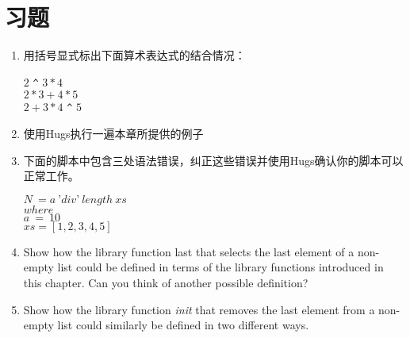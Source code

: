 \section{习题}

\begin{enumerate}
\item 用括号显式标出下面算术表达式的结合情况：

\noindent\hspace*{1cm} $2$ \verb|^| $3 * 4$\\
\hspace*{1cm} $2 * 3 + 4 * 5$\\
\hspace*{1cm} $2 + 3 * 4$ \verb|^| $5$

\item 使用Hugs执行一遍本章所提供的例子

\item
下面的脚本中包含三处语法错误，纠正这些错误并使用Hugs确认你的脚本可以正常工作。

\noindent\hspace*{1cm} $N~ = a~’div’~length~xs$\\
\hspace*{2cm} $       where$\\
\hspace*{3cm} $          a~=~10$\\
\hspace*{2.5cm} $        xs = [1, 2, 3, 4, 5]$

\item Show how the library function last that selects the last element of a
non-empty list could be defined in terms of the library functions introduced
in this chapter. Can you think of another possible definition?

\item Show how the library function \textit{init} that removes the last element from a
non-empty list could similarly be defined in two different ways.
\end{enumerate}

